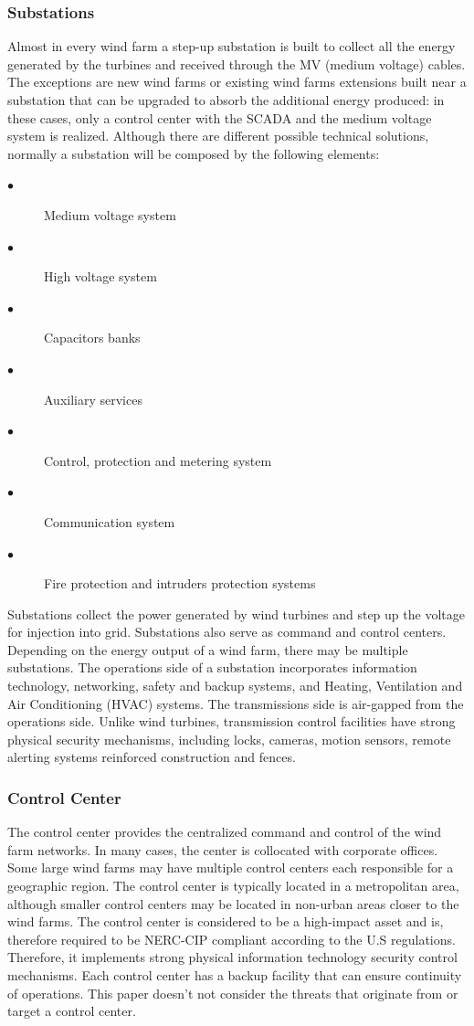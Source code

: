 \documentclass[twosided,a4,10pt]{article}
\begin{document}
\begin{multicols}{2}
  \subsubsection{Substations}
 Almost in every wind farm a step-up substation is built to collect all the energy generated by the turbines and received through the MV (medium voltage) cables. The exceptions are new wind farms or existing wind farms extensions built near a substation that can be upgraded to absorb the additional energy produced: in these cases, only a control center with the SCADA and the medium voltage system is realized.
 Although there are different possible technical solutions, normally a substation will be composed by the following elements:
 \begin{description}
 	\item[$\bullet$]
 	Medium voltage system
 	\item[$\bullet$]
 	High voltage system
 	\item[$\bullet$]
 	Capacitors banks
 	\item[$\bullet$]
 	Auxiliary services
 	\item[$\bullet$]
 	Control, protection and metering system
 	\item[$\bullet$]
 	Communication system
 	\item[$\bullet$]
 	Fire protection and intruders protection systems
 \end{description}
 Substations collect the power generated by wind turbines and step up the voltage for injection into grid. Substations also serve as command and control centers. Depending on the energy output of a wind farm, there may be multiple substations.
 The operations side of a substation incorporates information technology, networking, safety and backup systems, and Heating, Ventilation and Air Conditioning (HVAC) systems. The transmissions side is air-gapped from the operations side. Unlike wind turbines, transmission control facilities have strong physical security mechanisms, including locks, cameras, motion sensors, remote alerting systems reinforced construction and fences.
 
 \subsubsection{Control Center}
 The control center provides the centralized command and control of the wind farm networks. In many cases, the center is collocated with corporate offices. Some large wind farms may have multiple control centers each responsible for a geographic region.
 The control center is typically located in a metropolitan area, although smaller control centers may be located in non-urban areas closer to the wind farms. The control center is considered to be a high-impact asset and is, therefore required to be NERC-CIP compliant according to the U.S regulations. Therefore, it implements strong physical information technology security control mechanisms. Each control center has a backup facility that can ensure continuity of operations. This paper doesn’t not consider the threats that originate from or target a control center.
     

\end{multicols}
\end{document}
